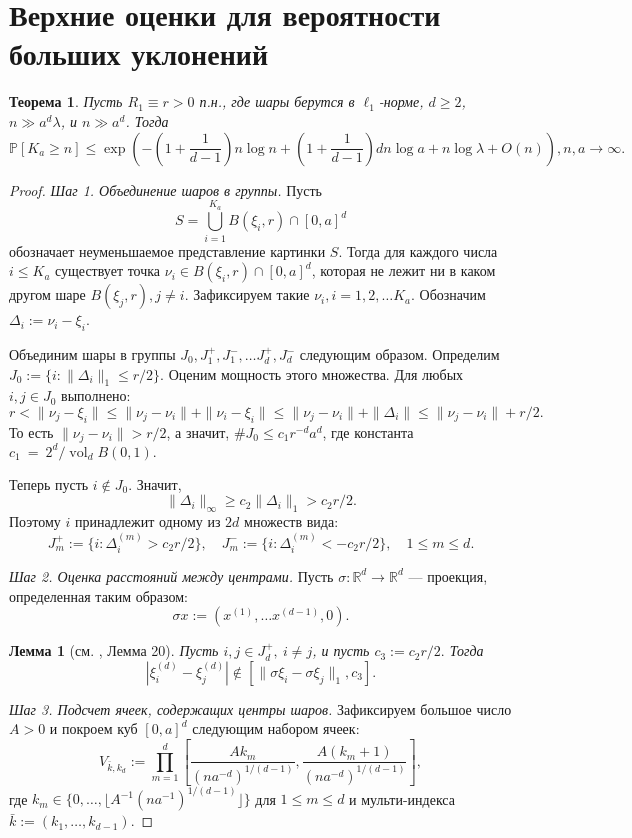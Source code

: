 \documentclass[12pt]{article}
\theoremstyle{plain}
\newtheorem{thm}{Теорема} %
\newtheorem{lm}{Лемма}
\theoremstyle{definition}
\theoremstyle{remark}
\def\geq{\geqslant}
\def\leq{\leqslant}
\DeclareMathOperator{\vol}{vol}
\newcommand{\R}{\mathbb{R}}
\newcommand{\PP}{\mathbb{P}}
\begin{document}
\section{Верхние оценки для вероятности больших уклонений}

\begin{thm}\label{uppconst1}
Пусть $R_1\equiv r > 0$ п.н., где шары берутся в $\ell_1$-норме, $d\geq 2$,  $n \gg a^d\lambda$, и $n\gg a^d$. 
Тогда $$\PP[K_a \geq n] \leq \exp \left(-\left(1+\dfrac{1}{d-1}\right)n\log n + \left(1 + \dfrac{1}{d-1}\right)dn\log a  + n\log\lambda + O(n)\right), n, a\to \infty.$$
\end{thm}{}



\begin{proof}
{\it Шаг 1. Объединение шаров в группы.} Пусть $$S = \bigcup_{i=1}^{K_a} B(\xi_i, r) \cap [0,a]^d$$ обозначает неуменьшаемое представление картинки $S$. Тогда для каждого числа $i\leq K_a$ существует точка $\nu_i\in B(\xi_i, r) \cap [0,a]^d$, которая не лежит ни в каком другом шаре $B(\xi_j, r), j \not= i$. Зафиксируем такие $\nu_i, i = 1, 2, \ldots K_a$. Обозначим $\Delta_i := \nu_i - \xi_i$.

Объединим шары в группы $J_0, J_1^+, J_1^-, \ldots J_d^+, J_d^-$ следующим образом. Определим $J_0 := \{i \colon \|\Delta_i\|_1 \leq r/2\}$. Оценим мощность этого множества. Для любых $i, j \in J_0$ выполнено:
$$r < \|\nu_j - \xi_i\| \leq \|\nu_j - \nu_i\| + \|\nu_i - \xi_i\| \leq 
\|\nu_j - \nu_i\| + \|\Delta_i\| \leq \|\nu_j - \nu_i\| + r/2.$$
То есть $\|\nu_j-\nu_i\|> r/2$, а значит, $\#J_0 \leq  c_1r^{-d}a^d$, где константа $c_1~=~2^d/\vol_d B(0,1).$

Теперь пусть $i\not\in J_0$. Значит, $$\|\Delta_i\|_\infty \geq c_2\|\Delta_i\|_1 > c_2r/2.$$ Поэтому $i$ принадлежит одному из $2d$ множеств вида: $$J_m^+ := \{i\colon \Delta_i^{(m)} > c_2r/2\}, \quad J_m^- := \{i\colon \Delta_i^{(m)} < - c_2r/2\}, \quad 1\leq m\leq d.$$

{\it Шаг 2. Оценка расстояний между центрами.} Пусть $\sigma \colon \R^d \to \R^d$ --- проекция, определенная таким образом: $$\sigma x := (x^{(1)}, \ldots x^{(d-1)}, 0).$$ 

\begin{lm}[см. \cite{AL}, Лемма 20]
Пусть $i, j\in J_d^+, \ i\not= j$, и пусть $c_3 := c_2 r/2.$ Тогда $$|\xi_i^{(d)} - \xi_j^{(d)}| \not\in [\|\sigma\xi_i - \sigma\xi_j\|_1, c_3].$$
\end{lm}{}

{\it Шаг 3. Подсчет ячеек, содержащих центры шаров.} 
Зафиксируем большое число $A > 0$ и покроем куб $[0, a]^d$ следующим набором ячеек: $$V_{\bar k, k_d} := \prod_{m = 1}^d\left[\dfrac{Ak_m}{(na^{-d})^{1/(d-1)}}, \dfrac{A(k_m+1)}{(na^{-d})^{1/(d-1)}}\right],$$
где $k_m\in \{0, \ldots, \lfloor A^{-1}(na^{-1})^{1/(d-1)}\rfloor\}$ для $1\leq m \leq d$ и мульти-индекса $\bar k := (k_1, \ldots, k_{d-1}).$


\end{proof}
\end{document}
